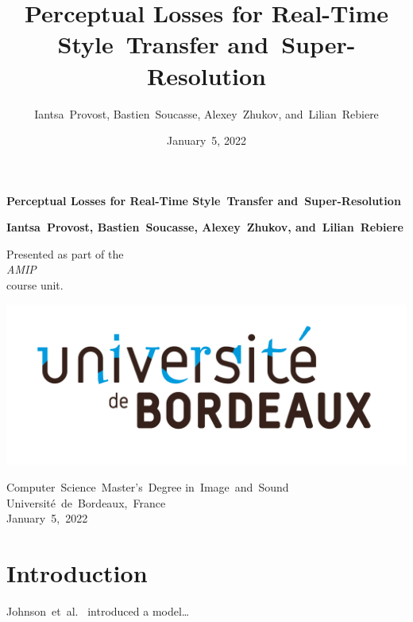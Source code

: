 \documentclass{article}
\title{Perceptual Losses for Real-Time Style~Transfer and~Super-Resolution}
\author{Iantsa~Provost, Bastien~Soucasse, Alexey~Zhukov, and~Lilian~Rebiere}
\date{January~5, 2022}
\begin{document}
{
    \begin{titlepage}
        \begin{center}
            \vspace*{1.5cm}
            
            \Large
            
            \textbf{Perceptual Losses for Real-Time Style~Transfer and~Super-Resolution}
            
            \vspace{.5cm}
            
            \vspace{1.5cm}
            
            \large
            
            \textbf{Iantsa~Provost, Bastien~Soucasse, Alexey~Zhukov, and~Lilian~Rebiere}
            
            \vfill
            
            \normalsize
            
            Presented as part of the\\
            \textit{AMIP}\\
            course unit.
            
            \vspace{1.5cm}
            
            \includegraphics[width=.5\textwidth]{images/college-logo.jpg}
            
            Computer~Science~Master's~Degree in~Image~and~Sound\\
            Université~de~Bordeaux,~France\\
            January~5,~2022
        \end{center}
    \end{titlepage}
    \newpage
    \setcounter{page}{2}
}

{
    \hypersetup{linkcolor=black}
    \tableofcontents
    \newpage
}

{
    \section{Introduction}
    \label{sec:introduction}

    Johnson~et~al.~\cite{https://doi.org/10.48550/arxiv.1603.08155} introduced a model…
}
\end{document}
